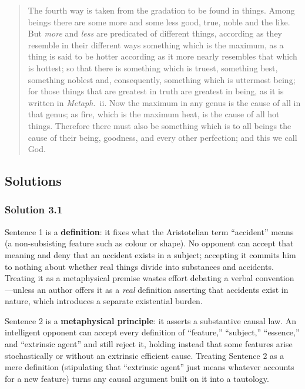 \begin{quote}
The fourth way is taken from the gradation to be found in things. Among beings there are some more and some less good, true, noble and the like. But \emph{more} and \emph{less} are predicated of different things, according as they resemble in their different ways something which is the maximum, as a thing is said to be hotter according as it more nearly resembles that which is hottest; so that there is something which is truest, something best, something noblest and, consequently, something which is uttermost being; for those things that are greatest in truth are greatest in being, as it is written in \emph{Metaph.}\ ii. Now the maximum in any genus is the cause of all in that genus; as fire, which is the maximum heat, is the cause of all hot things. Therefore there must also be something which is to all beings the cause of their being, goodness, and every other perfection; and this we call God.
\end{quote}

\subsection{Solutions}

\subsubsection*{Solution 3.1}
Sentence 1 is a \textbf{definition}: it fixes what the Aristotelian term ``accident'' means (a non-subsisting feature such as colour or shape). No opponent can accept that meaning and deny that an accident exists in a subject; accepting it commits him to nothing about whether real things divide into substances and accidents. Treating it as a metaphysical premise wastes effort debating a verbal convention---unless an author offers it as a \emph{real} definition asserting that accidents exist in nature, which introduces a separate existential burden.

Sentence 2 is a \textbf{metaphysical principle}: it asserts a substantive causal law. An intelligent opponent can accept every definition of ``feature,'' ``subject,'' ``essence,'' and ``extrinsic agent'' and still reject it, holding instead that some features arise stochastically or without an extrinsic efficient cause. Treating Sentence 2 as a mere definition (stipulating that ``extrinsic agent'' just means whatever accounts for a new feature) turns any causal argument built on it into a tautology.

